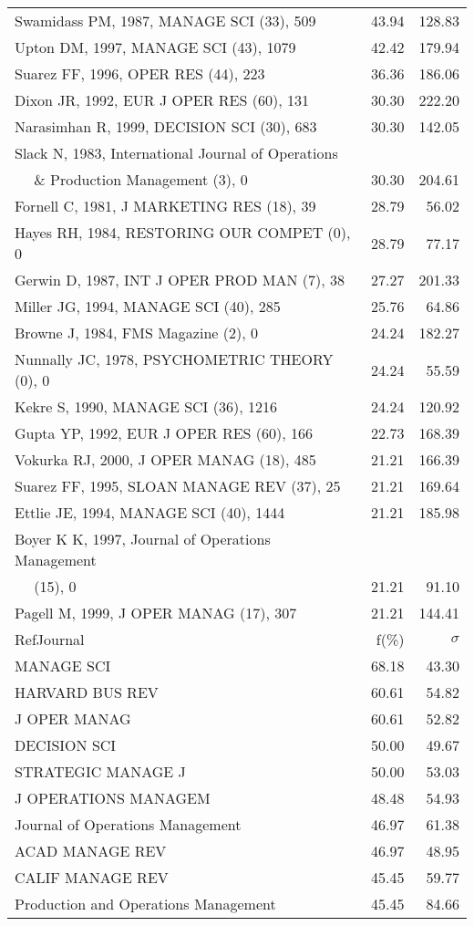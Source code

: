 \documentclass[a4paper,11pt]{report}
\begin{document}
\begin{landscape}
\begin{table}[!ht]
{\begin{tabular}{|l r r|}
Swamidass PM, 1987, MANAGE SCI (33), 509 & 43.94 & 128.83\\
Upton DM, 1997, MANAGE SCI (43), 1079 & 42.42 & 179.94\\
Suarez FF, 1996, OPER RES (44), 223 & 36.36 & 186.06\\
Dixon JR, 1992, EUR J OPER RES (60), 131 & 30.30 & 222.20\\
Narasimhan R, 1999, DECISION SCI (30), 683 & 30.30 & 142.05\\
Slack N, 1983, International Journal of Operations &  & \\
$\quad$ \& Production Management (3), 0 & 30.30 & 204.61\\
Fornell C, 1981, J MARKETING RES (18), 39 & 28.79 & 56.02\\
Hayes RH, 1984, RESTORING OUR COMPET (0), 0 & 28.79 & 77.17\\
Gerwin D, 1987, INT J OPER PROD MAN (7), 38 & 27.27 & 201.33\\
Miller JG, 1994, MANAGE SCI (40), 285 & 25.76 & 64.86\\
Browne J, 1984, FMS Magazine (2), 0 & 24.24 & 182.27\\
Nunnally JC, 1978, PSYCHOMETRIC THEORY (0), 0 & 24.24 & 55.59\\
Kekre S, 1990, MANAGE SCI (36), 1216 & 24.24 & 120.92\\
Gupta YP, 1992, EUR J OPER RES (60), 166 & 22.73 & 168.39\\
Vokurka RJ, 2000, J OPER MANAG (18), 485 & 21.21 & 166.39\\
Suarez FF, 1995, SLOAN MANAGE REV (37), 25 & 21.21 & 169.64\\
Ettlie JE, 1994, MANAGE SCI (40), 1444 & 21.21 & 185.98\\
Boyer K K, 1997, Journal of Operations Management &  & \\
$\quad$ (15), 0 & 21.21 & 91.10\\
Pagell M, 1999, J OPER MANAG (17), 307 & 21.21 & 144.41\\
\hline
\hline
RefJournal & f(\%) & $\sigma$\\
\hline
MANAGE SCI & 68.18 & 43.30\\
HARVARD BUS REV & 60.61 & 54.82\\
J OPER MANAG & 60.61 & 52.82\\
DECISION SCI & 50.00 & 49.67\\
STRATEGIC MANAGE J & 50.00 & 53.03\\
J OPERATIONS MANAGEM & 48.48 & 54.93\\
Journal of Operations Management & 46.97 & 61.38\\
ACAD MANAGE REV & 46.97 & 48.95\\
CALIF MANAGE REV & 45.45 & 59.77\\
Production and Operations Management & 45.45 & 84.66\\
\hline
\end{tabular}
}
\end{table}

\end{landscape}
\end{document}
